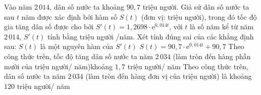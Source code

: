 \begin{ex}%
	Vào năm $2\,014$, dân số nước ta khoảng $90{,}7$ triệu người. Giả sử dân số nước ta sau $t$ năm được xác định bởi hàm số $S(t)$ (đơn vị: triệu người), trong đó tốc độ gia tăng dân số được cho  bởi $S'(t)=1{,}2698\cdot \mathrm{e}^{0{,}014t}$, với $t$ là số năm kể từ năm $2\,014$, $S'(t)$ tính bằng triệu người /năm. Xét tính đúng sai của các khẳng định sau:
	 \choiceTF
		{\True $S(t)$ là một nguyên hàm của $S'(t)$} 
		{$S(t)=90{,}7  \cdot \mathrm{e}^{0{,}014t}+90{,}7$}
		{\True Theo công thức trên, tốc độ tăng dân số nước ta năm $2\,034$ (làm tròn đến hàng phần mười của triệu người/ năm)khoảng $1{,}7$  triệu người/ năm}
		{\True Theo công thức trên, dân số nước ta năm $2\,034$ (làm tròn đến hàng đơn vị của triệu người) là khoảng $120$ triệu người/  năm}
\end{ex}

